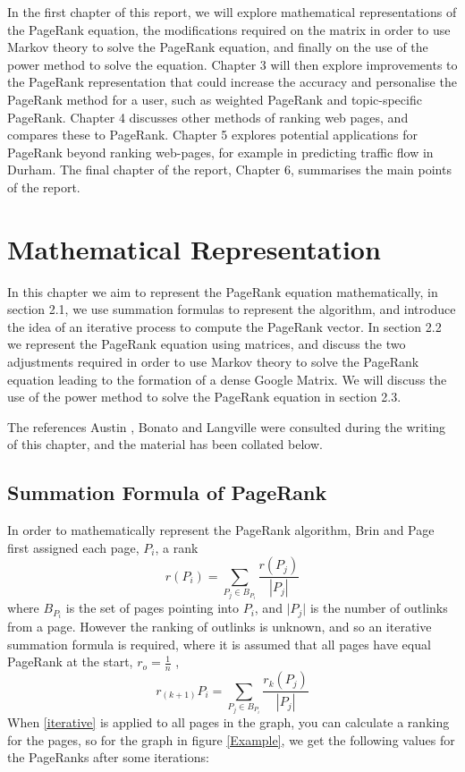 \documentclass[11pt]{report}
\begin{document}
In the first chapter of this report, we will explore mathematical representations of the PageRank equation, the modifications required on the matrix in order to use Markov theory to solve the PageRank equation, and finally on the use of the power method to solve the equation. Chapter 3 will then explore improvements to the PageRank representation that could increase the accuracy and personalise the PageRank method for a user, such as weighted PageRank and topic-specific PageRank. Chapter 4 discusses other methods of ranking web pages, and compares these to PageRank. Chapter 5 explores potential applications for PageRank beyond ranking web-pages, for example in predicting traffic flow in Durham. The final chapter of the report, Chapter 6, summarises the main points of the report.



\chapter{Mathematical Representation}
In this chapter we aim to represent the PageRank equation mathematically, in section 2.1, we use summation formulas to represent the algorithm, and introduce the idea of an iterative process to compute the PageRank vector. In section 2.2 we represent the PageRank equation using matrices, and discuss the two adjustments required in order to use Markov theory to solve the PageRank equation leading to the formation of a dense Google Matrix. We will discuss the use of the power method to solve the PageRank equation in section 2.3.

The references Austin \cite{austin}, Bonato \cite{bonato} and Langville \cite{langville} were consulted during the writing of this chapter, and the material has been collated below.  

\section{Summation Formula of PageRank}
In order to mathematically represent the PageRank algorithm, Brin and Page first assigned each page, $P_i$, a rank
\begin{equation}
r(P_i) = \displaystyle \sum_{P_j\in B_{P_i }} \frac{r(P_j)}{|P_j|}
\end{equation} where $B_{P_i}$ is the set of pages pointing into $P_i$, and $\vert P_j\vert$ is the number of outlinks from a page. However the ranking of outlinks is unknown, and so an iterative summation formula is required, where it is assumed that all pages have equal PageRank at the start, \(r_o = \frac{1}{n}\) , \begin{equation} \label{iterative}
r_{(k+1)}P_i = \displaystyle \sum_{P_j\in B_{P_i }}\frac{r_k(P_j)}{|P_j|}
\end{equation} When \eqref{iterative} is applied to all pages in the graph, you can calculate a ranking for the pages, so for the graph in figure \ref{Example}, we get the following values for the PageRanks after some iterations: 
\end{document}
